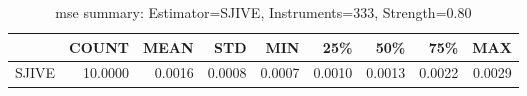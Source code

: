 \begin{table}[ht]
\centering
\caption{mse summary: Estimator=SJIVE, Instruments=333, Strength=0.80}
\begin{tabular}{lrrrrrrrr}
\toprule
 & COUNT & MEAN & STD & MIN & 25\% & 50\% & 75\% & MAX \\
\midrule
SJIVE & 10.0000 & 0.0016 & 0.0008 & 0.0007 & 0.0010 & 0.0013 & 0.0022 & 0.0029 \\
\bottomrule
\end{tabular}
\end{table}
